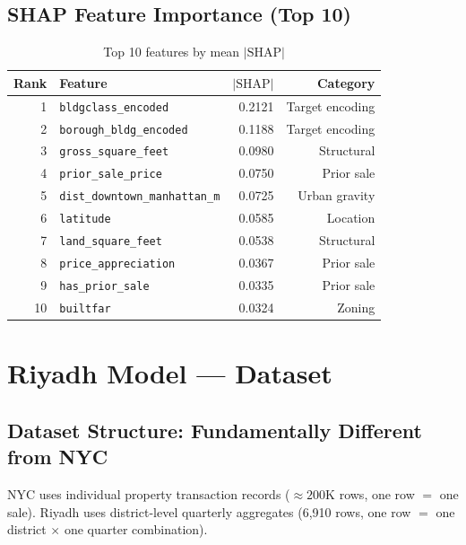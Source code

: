 \documentclass[11pt, a4paper, twoside]{report}
\begin{document}
\section{SHAP Feature Importance (Top 10)}
\begin{table}[H]
  \centering
  \caption{Top 10 features by mean $|\text{SHAP}|$}
  \begin{tabular}{rlrr}
    \toprule
    Rank & Feature & $|\text{SHAP}|$ & Category \\
    \midrule
    1  & \texttt{bldgclass\_encoded}          & 0.2121 & Target encoding \\
    2  & \texttt{borough\_bldg\_encoded}       & 0.1188 & Target encoding \\
    3  & \texttt{gross\_square\_feet}           & 0.0980 & Structural \\
    4  & \texttt{prior\_sale\_price}            & 0.0750 & Prior sale \\
    5  & \texttt{dist\_downtown\_manhattan\_m}  & 0.0725 & Urban gravity \\
    6  & \texttt{latitude}                      & 0.0585 & Location \\
    7  & \texttt{land\_square\_feet}            & 0.0538 & Structural \\
    8  & \texttt{price\_appreciation}           & 0.0367 & Prior sale \\
    9  & \texttt{has\_prior\_sale}              & 0.0335 & Prior sale \\
    10 & \texttt{builtfar}                      & 0.0324 & Zoning \\
    \bottomrule
  \end{tabular}
\end{table}

\chapter{Riyadh Model --- Dataset}
\label{ch:riyadh_data}

\section{Dataset Structure: Fundamentally Different from NYC}
NYC uses individual property transaction records ($\approx 200$K rows, one row
$=$ one sale). Riyadh uses district-level quarterly aggregates (6,910 rows, one
row $=$ one district $\times$ one quarter combination).
\end{document}
